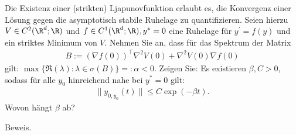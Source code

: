 \begin{exercise}
Die Existenz einer (strikten) Ljapunovfunktion erlaubt es, die Konvergenz einer
Lösung gegen die asymptotisch stabile Ruhelage zu quantifizieren. Seien hierzu
$V \in C^2(\R^d;\R)$ und $f \in C^1(\R^d;\R), y^* = 0$ eine Ruhelage für $y^{\prime} = f(y)$
und ein striktes Minimum von $V$. Nehmen Sie an, dass für das Spektrum der Matrix
\begin{align*}
  B := (\nabla f(0))^{\top}\nabla^2 V(0) + \nabla^2V(0)\nabla f(0)
\end{align*}
gilt: $\max\{\Re(\lambda): \lambda \in \sigma(B)\} =: \alpha < 0$.
Zeigen Sie: Es existieren $\beta,C > 0$, sodass für alle $y_0$ hinreichend nahe
bei $y^* = 0$ gilt:
\begin{align*}
  \|y_{0,y_0}(t)\| \leq C\exp(-\beta t).
\end{align*}
Wovon hängt $\beta$ ab?
\end{exercise}

\begin{solution}
Beweis.
\end{solution}
